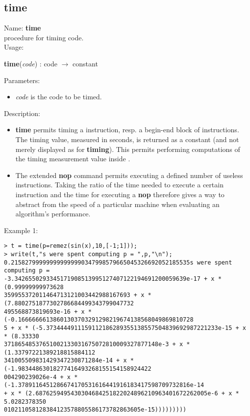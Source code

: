\subsection{time}
\label{labtime}
\noindent Name: \textbf{time}\\
procedure for timing \sollya code.\\
\noindent Usage: 
\begin{center}
\textbf{time}(\emph{code}) : \textsf{code} $\rightarrow$ \textsf{constant}\\
\end{center}
Parameters: 
\begin{itemize}
\item \emph{code} is the code to be timed.
\end{itemize}
\noindent Description: \begin{itemize}

\item \textbf{time} permits timing a \sollya instruction, resp. a begin-end block
   of \sollya instructions. The timing value, measured in seconds, is returned
   as a \sollya constant (and not merely displayed as for \textbf{timing}). This 
   permits performing computations of the timing measurement value inside \sollya.

\item The extended \textbf{nop} command permits executing a defined number of
   useless instructions. Taking the ratio of the time needed to execute a
   certain \sollya instruction and the time for executing a \textbf{nop}
   therefore gives a way to abstract from the speed of a particular 
   machine when evaluating an algorithm's performance.
\end{itemize}
\noindent Example 1: 
\begin{center}\begin{minipage}{15cm}\begin{Verbatim}[frame=single]
> t = time(p=remez(sin(x),10,[-1;1]));
> write(t,"s were spent computing p = ",p,"\n");
0.215827999999999999990347998579665045326692052185535s were spent computing p = 
-3.3426550293345171908513995127407122194691200059639e-17 + x * (0.99999999973628
359955372011464713121003442988167693 + x * (7.8802751877302786684499343799047732
495568873819693e-16 + x * (-0.16666666138601303703291298219674138568049869810728
5 + x * (-5.3734444911159112186289355138557504839692987221233e-15 + x * (8.33330
37186548537651002133031675072810009327877148e-3 + x * (1.33797221389218815884112
341005509831429347230871284e-14 + x * (-1.98344863018277416493268155154158924422
004290239026e-4 + x * (-1.3789116451286674170531616441916183417598709732816e-14 
+ x * (2.6876259495430304684251822024896210963401672262005e-6 + x * 5.0282378350
010211058128384123578805586173782863605e-15)))))))))
\end{Verbatim}
\end{minipage}\end{center}
